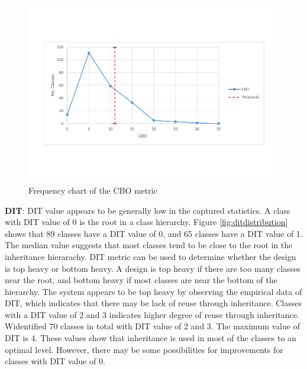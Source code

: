\begin{figure}
	\centering
	\includegraphics[width=\textwidth]{images/threshold/cbo.pdf}
	\caption{Frequency chart of the CBO metric}
	\label{fig:cbodistribution}
\end{figure}



\textbf{DIT}: DIT value appears to be generally low in the captured statistics. A class with DIT value of 0 is the root in a class hierarchy. Figure \ref{fig:ditdistribution} shows that 89 classes have a DIT value of 0, and 65 classes have a DIT value of 1. The median value suggests that most classes tend to be close to the root in the inheritance hierarachy. DIT metric can be used to determine whether the design is top heavy or bottom heavy\cite{chidamber1994metrics}. A design is top heavy if there are too many classes near the root, and bottom heavy if most classes are near the bottom of the hierarchy. The system appears to be top heavy by observing the empirical data of DIT, which indicates that there may be lack of reuse through inheritance. Classes with a DIT value of 2 and 3 indicates higher degree of reuse through inheritance. Widentified 70 classes in total with DIT value of 2 and 3. The maximum value of DIT is 4. These values show that inheritance is used in most of the classes to an optimal level. However, there may be some possibilities for improvements for classes with DIT value of 0. 

